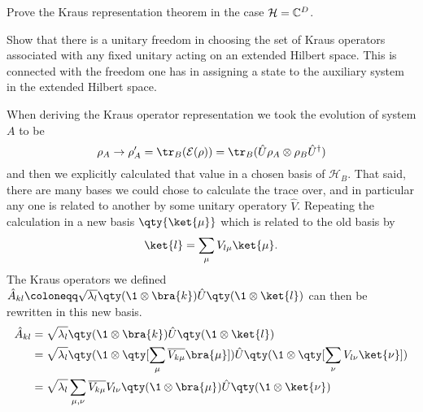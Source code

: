 \documentclass[
	pages,
	boxes,
	color=RoyalPurple
]{homework}
\makeatletter
\numberwithin{tcb@cnt@prob}{section}
\makeatother
\begin{document}
\setcounter{section}{11}

\begin{problem}
Prove the Kraus representation theorem in the case $\mathcal{H} = \mathbb{C}^D$.
\end{problem}

\begin{solution}
\end{solution}

\begin{problem}
Show that there is a unitary freedom in choosing the set of Kraus operators associated with any fixed unitary acting on an extended Hilbert space. This is connected with the freedom one has in assigning a state to the auxiliary system in the extended Hilbert space.
\end{problem}

\begin{solution}
    When deriving the Kraus operator representation we took the evolution of system $A$ to be
    \begin{equation*}
        \rho_A\to\rho_A' = \tr_B(\mathcal{E}(\rho)) = \tr_B(\hat{U}\rho_A\otimes\rho_B\hat{U}^\dagger)
    \end{equation*}
    and then we explicitly calculated that value in a chosen basis of $\mathcal{H}_B$. That said, there are many bases we could chose to calculate the trace over, and in particular any one is related to another by some unitary operatory $\hat{V}$. Repeating the calculation in a new basis $\qty{\ket{\mu}}$ which is related to the old basis by
    \begin{equation*}
        \ket{l} = \sum_\mu V_{l \mu}\ket{\mu}.
    \end{equation*}
    The Kraus operators we defined $\hat{A}_{kl}\defeq \sqrt{\lambda_l}\qty(\1\otimes\bra{k})\hat{U}\qty(\1\otimes\ket{l})$ can then be rewritten in this new basis.
    \begin{align*}
        \hat{A}_{kl} & =  \sqrt{\lambda_l}\qty(\1\otimes\bra{k})\hat{U}\qty(\1\otimes\ket{l})                                                              \\
                     & =  \sqrt{\lambda_l}\qty(\1\otimes\qty[\sum_\mu \overline{V_{k\mu}}\bra{\mu}])\hat{U}\qty(\1\otimes\qty[\sum_\nu V_{l\nu}\ket{\nu}]) \\
                     & = \sqrt{\lambda_l}\sum_{\mu,\nu}\overline{V_{k\mu}}V_{l\nu}\qty(\1\otimes\bra{\mu})\hat{U}\qty(\1\otimes\ket{\nu})
    \end{align*}
\end{solution}
\end{document}
